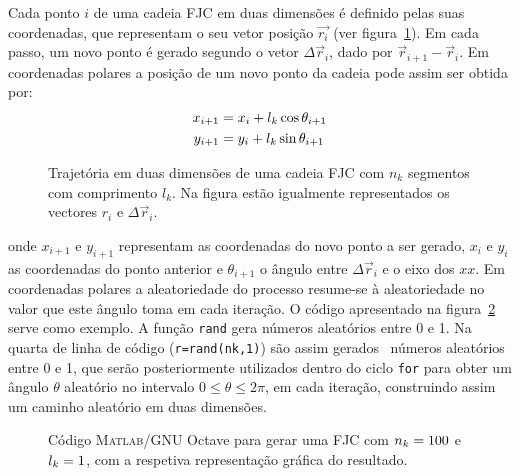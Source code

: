 Cada ponto $i$ de uma cadeia FJC em duas dimensões é definido pelas suas coordenadas, que representam o seu vetor posição $\vec{r_{i}}$ (ver figura~\ref{fig:rw2d}). Em cada passo, um novo ponto é gerado segundo o vetor $\Delta\vec{r}_{i}$, dado por $\vec{r}_{i+1}-\vec{r}_{i}$. Em coordenadas polares a posição de um novo ponto da cadeia pode assim ser obtida por: 
%
\begin{equation}
\label{eq:xi}
\begin{split}
x_{i+1} & = x_{i}+l_{k} \cos \theta_{i+1} \\
y_{i+1} & = y_{i}+l_{k} \sin \theta_{i+1}
\end{split}
\end{equation}
% 
\begin{figure}
	\centering
	\setlength\figureheight{6cm} 
	\setlength\figurewidth{6cm}
	
	\caption[Trajetória em duas dimensões de uma cadeia FJC]{Trajetória em duas dimensões de uma cadeia FJC com $n_{k}$ segmentos com comprimento $l_{k}$. Na figura estão igualmente representados os vectores $r_{i}$ e $\Delta\vec{r}_{i}$.}
	\label{fig:rw2d}
\end{figure}
onde $x_{i+1}$ e $y_{i+1}$ representam as coordenadas do novo ponto a ser gerado, $x_{i}$ e $y_{i}$ as coordenadas do ponto anterior e $\theta_{i+1}$ o ângulo entre $\Delta\vec{r}_{i}$ e o eixo dos $xx$. Em coordenadas polares a aleatoriedade do processo resume-se à aleatoriedade no valor que este ângulo toma em cada iteração. O código apresentado na figura~\ref{fig:FJCcode} serve como exemplo.
%
A função \texttt{rand} gera números aleatórios entre 0 e 1. 
%
Na quarta de linha de código (\texttt{r=rand(nk,1)}) são assim gerados \numsegmento\ números aleatórios entre 0 e 1, que serão posteriormente utilizados dentro do ciclo \texttt{for} para obter um ângulo $\theta$ aleatório no intervalo $0\leq\theta\leq2\pi$, em cada iteração, construindo assim um caminho aleatório em duas dimensões. 

\begin{figure}
  \centering
	
\caption[Código \textsc{Matlab}\textsuperscript{\textregistered}/GNU Octave para gerar uma FJC]{Código \textsc{Matlab}\textsuperscript{\textregistered}/GNU Octave para gerar uma FJC com $\protect n_{k} = 100$ e $\protect l_{k} = 1$, com a respetiva representação gráfica do resultado.}
\label{fig:FJCcode}
\end{figure}

